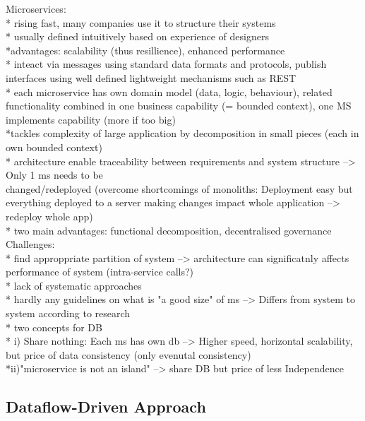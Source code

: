 Microservices: \\
* rising fast, many companies use it to structure their systems\\
* usually defined intuitively based on experience of designers\\
*advantages: scalability (thus resillience), enhanced performance\\
* inteact via messages using standard data formats and protocols, publish interfaces using well defined lightweight mechanisms such as REST\\
* each microservice has own domain model (data, logic, behaviour), related functionality combined in one business capability (= bounded context), one MS implements capability (more if too big)\\
*tackles complexity of large application by decomposition in small pieces (each in own bounded context)\\
* architecture enable traceability between requirements and system structure --> Only 1 ms needs to be\\ changed/redeployed (overcome shortcomings of monoliths: Deployment easy but everything deployed to a server making changes impact whole application --> redeploy whole app)\\
* two main advantages: functional decomposition, decentralised governance\\
 



Challenges: \\
* find approppriate partition of system --> architecture can significatnly affects performance of system (intra-service calls?) \\
* lack of systematic approaches \\
* hardly any guidelines on what is "a good size" of ms --> Differs from system to system according to research\\
* two concepts for DB\\
* i) Share nothing: Each ms has own db --> Higher speed, horizontal scalability, but price of data consistency (only evenutal consistency)\\
*ii)"microservice is not an island" --> share DB but price of less Independence\\


\subsection{Dataflow-Driven Approach}
\cite{DataflowDrivenChen} \\

